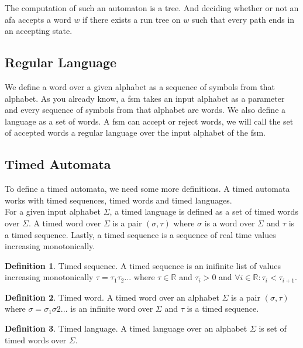 \documentclass[12pt]{article}
\theoremstyle{definition}
\newtheorem{definition}{Definition}[section]
\theoremstyle{definition}
\newcommand{\R}{\mathbb{R}}
\begin{document}
The computation of such an automaton is a tree. And deciding whether or not an \gls{afa} accepts a word $w$ if there exists a run tree on $w$ such that every path ends in an accepting state.~\cite{AFA:2017}\\

\subsection{Regular Language}

We define a word over a given alphabet as a sequence of symbols from that alphabet. As you already know, a \gls{fsm} takes an input alphabet as a parameter and every sequence of symbols from that alphabet are words. We also define a language as a set of words. A \gls{fsm} can accept or reject words, we will call the set of accepted words a regular language over the input alphabet of the \gls{fsm}.

\subsection{Timed Automata}

To define a timed automata, we need some more definitions. A timed automata works with timed sequences, timed words and timed languages.\\

For a given input alphabet $\Sigma$, a timed language is defined as a set of timed words over $\Sigma$. A timed word over $\Sigma$ is a pair $(\sigma, \tau)$ where $\sigma$ is a word over $\Sigma$ and $\tau$ is a timed sequence. Lastly, a timed sequence is a sequence of real time values increasing monotonically.~\cite{ALUR1994183}

\theoremstyle{definition}
\begin{definition}{Timed sequence.}
A timed sequence is an inifinite list of values increasing monotonically $\tau = \tau_1 \tau_2 ...$ where $\tau \in \R$ and $\tau_i > 0$ and $\forall i \in \R: \tau_i < \tau_{i+1}$.
\end{definition}

\theoremstyle{definition}
\begin{definition}{Timed word.}
A timed word over an alphabet $\Sigma$ is a pair $(\sigma, \tau)$ where $\sigma = \sigma_1 \sigma2 ...$ is an infinite word over $\Sigma$ and $\tau$ is a timed sequence.
\end{definition}

\theoremstyle{definition}
\begin{definition}{Timed language.}
A timed language over an alphabet $\Sigma$ is set of timed words over $\Sigma$.
\end{definition}
\end{document}
